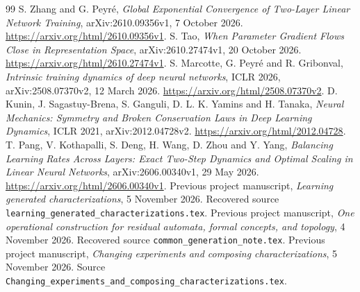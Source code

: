 \documentclass[11pt]{article}
\theoremstyle{remark}\newtheorem{remark}[theorem]{Remark}
\begin{document}
\begin{thebibliography}{99}
 S. Zhang and G. Peyr\'e,
\emph{Global Exponential Convergence of Two-Layer Linear Network Training},
arXiv:2610.09356v1, 7 October 2026.
\url{https://arxiv.org/html/2610.09356v1}.
 S. Tao,
\emph{When Parameter Gradient Flows Close in Representation Space},
arXiv:2610.27474v1, 20 October 2026.
\url{https://arxiv.org/html/2610.27474v1}.
 S. Marcotte, G. Peyr\'e and R. Gribonval,
\emph{Intrinsic training dynamics of deep neural networks}, ICLR 2026,
arXiv:2508.07370v2, 12 March 2026.
\url{https://arxiv.org/html/2508.07370v2}.
 D. Kunin, J. Sagastuy-Brena, S. Ganguli,
D. L. K. Yamins and H. Tanaka,
\emph{Neural Mechanics: Symmetry and Broken Conservation Laws in Deep
Learning Dynamics}, ICLR 2021, arXiv:2012.04728v2.
\url{https://arxiv.org/html/2012.04728}.
 T. Pang, V. Kothapalli, S. Deng, H. Wang, D. Zhou and Y. Yang,
\emph{Balancing Learning Rates Across Layers: Exact Two-Step Dynamics and
Optimal Scaling in Linear Neural Networks}, arXiv:2606.00340v1,
29 May 2026. \url{https://arxiv.org/html/2606.00340v1}.
 Previous project manuscript,
\emph{Learning generated characterizations}, 5 November 2026.
Recovered source \texttt{learning\_generated\_characterizations.tex}.
 Previous project manuscript,
\emph{One operational construction for residual automata, formal concepts,
and topology}, 4 November 2026.
Recovered source \texttt{common\_generation\_note.tex}.
 Previous project manuscript,
\emph{Changing experiments and composing characterizations},
5 November 2026. Source
\texttt{Changing\_experiments\_and\_composing\_characterizations.tex}.
\end{thebibliography}
\end{document}
